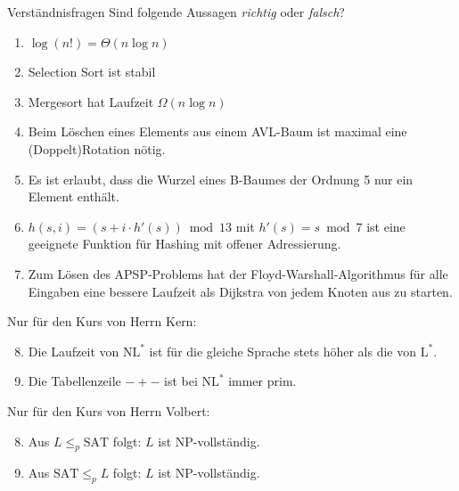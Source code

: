 \documentclass[11pt,a4paper]{article}
\begin{document}
\thispagestyle{empty}
\DeclareRobustCommand{\ttfamily}{\fontencoding{T1}\fontfamily{lmtt}\selectfont}

\newcommand{\quotes}[1]{\glqq{}#1\grqq{}}




\begin{aufgabe}{1}{Verständnisfragen}
    Sind folgende Aussagen \emph{richtig} oder \emph{falsch}?
    \begin{enumerate}
        \item $\log(n!) = \Theta(n \log n)$
        \item Selection Sort ist stabil
        \item Mergesort hat Laufzeit $\Omega(n \log n)$
        \item Beim Löschen eines Elements aus einem AVL-Baum ist maximal eine (Doppelt)Rotation nötig.
        \item Es ist erlaubt, dass die Wurzel eines B-Baumes der Ordnung 5 nur ein Element enthält.
        \item $h(s, i) = (s + i \cdot h'(s)) \bmod 13$ mit $h'(s) = s \bmod 7$ ist eine geeignete Funktion für Hashing mit offener Adressierung.
        \item Zum Lösen des APSP-Problems hat der Floyd-Warshall-Algorithmus für alle Eingaben eine bessere Laufzeit als Dijkstra von jedem Knoten aus zu starten.
    \end{enumerate}
    Nur für den Kurs von Herrn Kern:
    \begin{enumerate}
        \setcounter{enumi}{7}
        \item Die Laufzeit von $\mathrm{NL}^*$ ist für die gleiche Sprache stets höher als die von $\mathrm{L}^*$.
        \item Die Tabellenzeile $-+-$ ist bei $\mathrm{NL}^*$ immer prim.
    \end{enumerate}
    Nur für den Kurs von Herrn Volbert:
    \begin{enumerate}
        \setcounter{enumi}{7}
        \item Aus $L \leq_p \mathrm{SAT}$ folgt: $L$ ist NP-vollständig.
        \item Aus $\mathrm{SAT} \leq_p L$ folgt: $L$ ist NP-vollständig.
    \end{enumerate}
\end{aufgabe}
\end{document}
